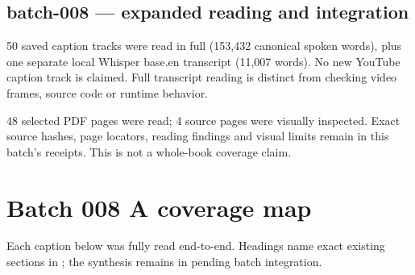 \subsection{batch-008 --- expanded reading and integration}\label{appendix-877738f6f4d2-batch-008-expanded-reading-and-integration}

\hypertarget{appendix-877738f6f4d2-batch-008-expanded-reading-and-integration}{}

50 saved caption tracks were read in full (153,432 canonical spoken words), plus one separate local Whisper base.en transcript (11,007 words). No new YouTube caption track is claimed. Full transcript reading is distinct from checking video frames, source code or runtime behavior.

48 selected PDF pages were read; 4 source pages were visually inspected. Exact source hashes, page locators, reading findings and visual limits remain in this batch's receipts. This is not a whole-book coverage claim.

\section{Batch 008 A coverage map}\label{appendix-877738f6f4d2-batch-008-a-coverage-map}

\hypertarget{appendix-877738f6f4d2-batch-008-a-coverage-map}{}

Each caption below was fully read end-to-end. Headings name exact existing sections in ; the synthesis remains in  pending batch integration.

